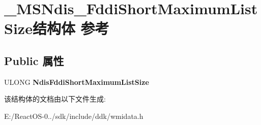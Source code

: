 \hypertarget{struct___m_s_ndis___fddi_short_maximum_list_size}{}\section{\+\_\+\+M\+S\+Ndis\+\_\+\+Fddi\+Short\+Maximum\+List\+Size结构体 参考}
\label{struct___m_s_ndis___fddi_short_maximum_list_size}
\subsection*{Public 属性}
\begin{DoxyCompactItemize}
\item 
\mbox{\label{struct___m_s_ndis___fddi_short_maximum_list_size_ac5f06ab10ab89bd1de45f62cb3650c11}} 
U\+L\+O\+NG {\bfseries Ndis\+Fddi\+Short\+Maximum\+List\+Size}
\end{DoxyCompactItemize}


该结构体的文档由以下文件生成\+:\begin{DoxyCompactItemize}
\item 
E\+:/\+React\+O\+S-\/0../sdk/include/ddk/wmidata.\+h\end{DoxyCompactItemize}
